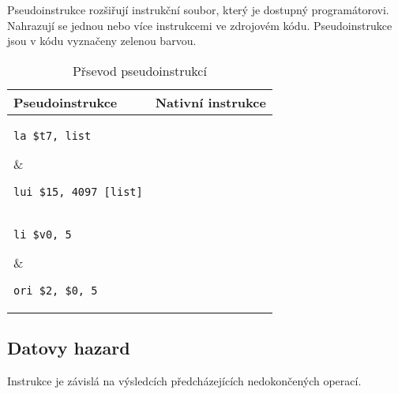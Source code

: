 \documentclass[11pt, titlepage]{article}
\begin{document}
Pseudoinstrukce rozšiřují instrukční soubor, který je dostupný programátorovi. Nahrazují se jednou nebo více instrukcemi ve zdrojovém kódu. Pseudoinstrukce jsou v kódu vyznačeny zelenou barvou.


\begin{table}[h!]
\centering
\caption{Přsevod pseudoinstrukcí}
\begin{tabular}{l|l}\\
Pseudoinstrukce & Nativní instrukce \\ 
\hline

\begin{lstlisting}
la $t7, list
\end{lstlisting} &
\begin{lstlisting}
lui $15, 4097 [list]
\end{lstlisting}\\

\hline

\begin{lstlisting}
li $v0, 5
\end{lstlisting} & 
\begin{lstlisting}
ori $2, $0, 5
\end{lstlisting}\\

\hline

\begin{lstlisting}
blt $t2,$t3,swap
\end{lstlisting} & 
\begin{lstlisting}
slt $1, $10, $11
bne $1, $0, 12 [swap-0x004000bc] 
\end{lstlisting}\\

\end{tabular}
\end{table}


\subsection{Datovy hazard}
Instrukce je závislá na výsledcích předcházejících nedokončených operací.
\end{document}

